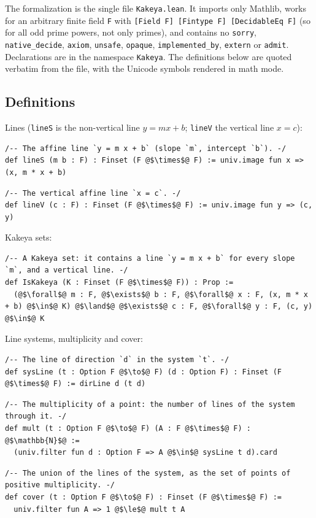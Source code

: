 \documentclass[11pt,a4paper]{article}
\theoremstyle{definition}
\theoremstyle{remark}
\begin{document}
The formalization is the single file \texttt{Kakeya.lean}. It imports only Mathlib, works for an
arbitrary finite field \texttt{F} with \texttt{[Field F] [Fintype F] [DecidableEq F]} (so for all odd
prime powers, not only primes), and contains no \texttt{sorry}, \texttt{native\_decide}, \texttt{axiom},
\texttt{unsafe}, \texttt{opaque}, \texttt{implemented\_by}, \texttt{extern} or \texttt{admit}. Declarations are in
the namespace \texttt{Kakeya}. The definitions below are quoted verbatim from the file, with the
Unicode symbols rendered in math mode.

\subsection{Definitions}

Lines (\texttt{lineS} is the non-vertical line $y=mx+b$; \texttt{lineV} the vertical line $x=c$):
\begin{lstlisting}
/-- The affine line `y = m x + b` (slope `m`, intercept `b`). -/
def lineS (m b : F) : Finset (F @$\times$@ F) := univ.image fun x => (x, m * x + b)
\end{lstlisting}
\begin{lstlisting}
/-- The vertical affine line `x = c`. -/
def lineV (c : F) : Finset (F @$\times$@ F) := univ.image fun y => (c, y)
\end{lstlisting}

Kakeya sets:
\begin{lstlisting}
/-- A Kakeya set: it contains a line `y = m x + b` for every slope `m`, and a vertical line. -/
def IsKakeya (K : Finset (F @$\times$@ F)) : Prop :=
  (@$\forall$@ m : F, @$\exists$@ b : F, @$\forall$@ x : F, (x, m * x + b) @$\in$@ K) @$\land$@ @$\exists$@ c : F, @$\forall$@ y : F, (c, y) @$\in$@ K
\end{lstlisting}

Line systems, multiplicity and cover:
\begin{lstlisting}
/-- The line of direction `d` in the system `t`. -/
def sysLine (t : Option F @$\to$@ F) (d : Option F) : Finset (F @$\times$@ F) := dirLine d (t d)
\end{lstlisting}
\begin{lstlisting}
/-- The multiplicity of a point: the number of lines of the system through it. -/
def mult (t : Option F @$\to$@ F) (A : F @$\times$@ F) : @$\mathbb{N}$@ :=
  (univ.filter fun d : Option F => A @$\in$@ sysLine t d).card
\end{lstlisting}
\begin{lstlisting}
/-- The union of the lines of the system, as the set of points of positive multiplicity. -/
def cover (t : Option F @$\to$@ F) : Finset (F @$\times$@ F) :=
  univ.filter fun A => 1 @$\le$@ mult t A
\end{lstlisting}
\end{document}
